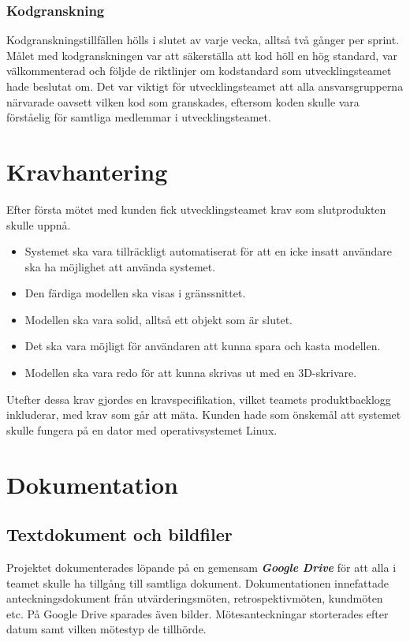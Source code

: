 \documentclass[a4paper,12pt,oneside,final]{extbook}
\begin{document}
\subsubsection{Kodgranskning}
Kodgranskningstillfällen hölls i slutet av varje vecka, alltså två gånger per sprint. Målet med kodgranskningen var att säkerställa att kod höll en hög standard, var välkommenterad och följde de riktlinjer om kodstandard som utvecklingsteamet hade beslutat om. Det var viktigt för utvecklingsteamet att alla ansvarsgrupperna närvarade oavsett vilken kod som granskades, eftersom koden skulle vara förståelig för samtliga medlemmar i utvecklingsteamet.

\section{Kravhantering}
Efter första mötet med kunden fick utvecklingsteamet krav som slutprodukten skulle uppnå.
\begin{itemize}
\item Systemet ska vara tillräckligt automatiserat för att en icke insatt användare ska ha möjlighet att använda systemet.
\item Den färdiga modellen ska visas i gränssnittet.
\item Modellen ska vara solid, alltså ett objekt som är slutet.
\item Det ska vara möjligt för användaren att kunna spara och kasta modellen.
\item Modellen ska vara redo för att kunna skrivas ut med en 3D-skrivare.
\end{itemize}

Utefter dessa krav gjordes en kravspecifikation, vilket teamets produktbacklogg inkluderar, med krav som går att mäta. Kunden hade som önskemål att systemet skulle fungera på en dator med operativsystemet Linux.

\section{Dokumentation}
\subsection{Textdokument och bildfiler}
Projektet dokumenterades löpande på en gemensam \emph{\textbf{Google Drive}} för att alla i teamet skulle ha tillgång till samtliga dokument. Dokumentationen innefattade anteckningsdokument från utvärderingsmöten, retrospektivmöten, kundmöten etc. På Google Drive sparades även bilder. Mötesanteckningar storterades efter datum samt vilken mötestyp de tillhörde.
\end{document}
